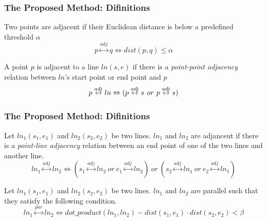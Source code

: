 \begin{frame}
\frametitle{The Proposed Method: Difinitions}

\begin{definition}
  Two points are adjacent if their Euclidean distance is below a predefined threshold $\alpha$
  \begin{equation}
    p \overset{adj}{\leftrightarrow} q \Leftrightarrow dist(p,q) \leq \alpha
  \end{equation}
\end{definition}

\begin{definition}
  A point $p$ is adjacent to a line $ln(s,e)$ if there is a \emph{point-point adjacency} relation between $ln$'s start point or end point and $p$
  \begin{equation}
    p \overset{adj}{\leftrightarrow} ln \Leftrightarrow (p \overset{adj}{\leftrightarrow} s \textbf ~or~ p \overset{adj}{\leftrightarrow} s)
  \end{equation}
\end{definition}

\end{frame}


\begin{frame}
\frametitle{The Proposed Method: Difinitions}

\begin{definition}
  Let $ln_1(s_1, e_1)$ and $ln_2(s_2, e_2)$ be two lines. $ln_1$ and $ln_2$ are adjancent if there is a \emph{point-line adjacency} relation between an end point of one of the two lines and another line.
  \begin{equation}
    ln_1 \overset{adj}{\leftrightarrow} ln_2 \Leftrightarrow (s_1 \overset{adj}{\leftrightarrow} ln_2 ~or~e_1 \overset{adj}{\leftrightarrow} ln_2) ~or~ (s_2 \overset{adj}{\leftrightarrow} ln_1 ~or~e_2 \overset{adj}{\leftrightarrow} ln_1)
  \end{equation}
\end{definition}

\begin{definition}
  Let $ln_1(s_1, e_1)$ and $ln_2(s_2, e_2)$ be two lines. $ln_1$ and $ln_2$ are parallel such that they satisfy the following condition.
  \begin{equation}
    ln_1 \overset{par}{\leftrightarrow} ln_2 \Leftrightarrow dot\_product(ln_1, ln_2) - dist(s_1, e_1) \cdot dist(s_2,e_2) < \beta
  \end{equation}
\end{definition}

\end{frame}

